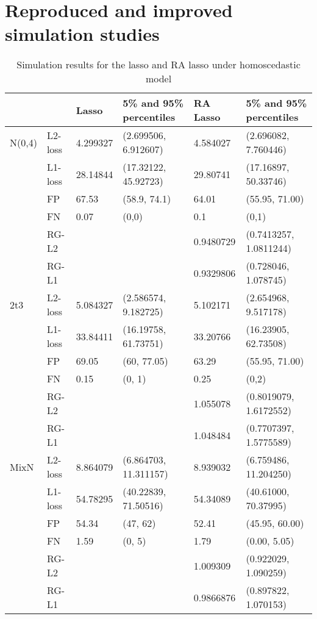 

\section{Reproduced and improved simulation studies}\label{sec:newsimulation}

\begin{table}[]
\begin{tabular}{llllll}
       &         & Lasso    & 5\% and 95\% percentiles & RA Lasso  & 5\% and 95\% percentiles \\ \hline
N(0,4) & L2-loss & 4.299327 & (2.699506, 6.912607)     & 4.584027  & (2.696082, 7.760446)     \\
       & L1-loss & 28.14844 & (17.32122, 45.92723)     & 29.80741  & (17.16897, 50.33746)     \\
       & FP      & 67.53    & (58.9, 74.1)             & 64.01     & (55.95, 71.00)           \\
       & FN      & 0.07     & (0,0)                    & 0.1       & (0,1)                    \\
       & RG-L2   &          &                          & 0.9480729  & (0.7413257, 1.0811244)   \\
       & RG-L1   &          &                          & 0.9329806  & (0.728046, 1.078745)   \\ \hline
2t3    & L2-loss & 5.084327 & (2.586574, 9.182725)     & 5.102171  & (2.654968, 9.517178)     \\
       & L1-loss & 33.84411 & (16.19758, 61.73751)     & 33.20766  & (16.23905, 62.73508)     \\
       & FP      & 69.05    & (60, 77.05)              & 63.29     & (55.95, 71.00)           \\
       & FN      & 0.15     & (0, 1)                   & 0.25      & (0,2)                    \\
       & RG-L2   &          &                          & 1.055078 & (0.8019079, 1.6172552)   \\
       & RG-L1   &          &                          & 1.048484  & (0.7707397, 1.5775589)     \\ \hline
MixN   & L2-loss & 8.864079 & (6.864703, 11.311157)    & 8.939032  & (6.759486, 11.204250)    \\
       & L1-loss & 54.78295 & (40.22839, 71.50516)     & 54.34089  & (40.61000, 70.37995)     \\
       & FP      & 54.34    & (47, 62)                 & 52.41     & (45.95, 60.00)           \\
       & FN      & 1.59     & (0, 5)                   & 1.79      & (0.00, 5.05)             \\
       & RG-L2   &          &                          & 1.009309 & (0.922029, 1.090259)   \\
       & RG-L1   &          &                          & 0.9866876  & (0.897822, 1.070153)  
\end{tabular}
\caption{Simulation results for the lasso and RA lasso under homoscedastic model}
\end{table}